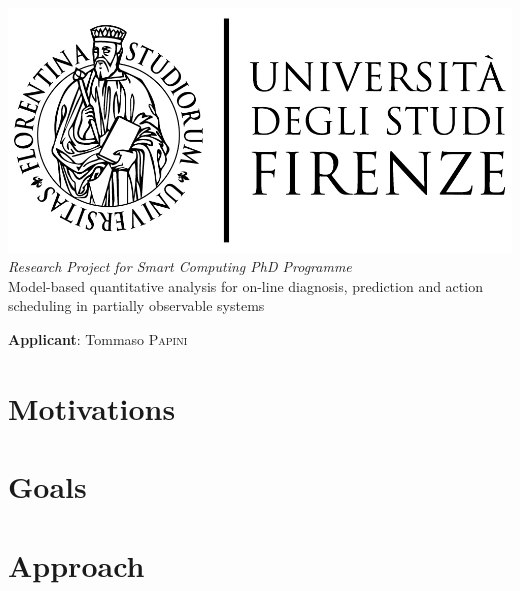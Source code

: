 \documentclass{article}
\begin{document}
    
    \begin{center}
        \includegraphics[scale=0.2]{logo_unifi.jpg}\\[4cm]
        \textit{Research Project for Smart Computing PhD Programme}\\[0.3cm]
        {\Huge Model-based quantitative analysis for on-line diagnosis, prediction and action scheduling in partially observable systems}
    \end{center}
    
    \vfill
    
    \textbf{Applicant}: Tommaso \textsc{Papini}
    
    \clearpage
    
    \section*{Motivations}
    
        
    \section*{Goals}
    
    
    \section*{Approach}
    
    \clearpage
    
	\nocite{*}
	
	
\end{document}
